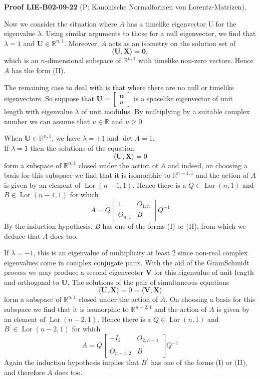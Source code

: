 \documentclass[10pt, letterpaper]{article}
\newcommand{\CustomHeading}[3]{%
  \par\medskip\noindent%
  \textbf{#1 #2} \textnormal{(#3)}.\enskip%
}
\newenvironment{PROOF}[2]{\begin{unitbox}\CustomHeading{Proof}{#1}{#2}}{\end{unitbox}}
\begin{document}
\begin{PROOF}{LIE-B02-09-22}{P: Kanonische Normalformen von Lorentz-Matrizen}
Now we consider the situation where $A$ has a timelike eigenvector U for the eigenvalue $\lambda$. Using similar arguments to those for a null eigenvector, we find that $\lambda=1$ and $\mathbf{U} \in \mathbb{R}^{n, 1}$. Moreover, $A$ acts as an isometry on the solution set of
$$
\langle\mathbf{U}, \mathbf{X}\rangle=\mathbf{0},
$$
which is an $n$-dimensional subspace of $\mathbb{R}^{n, 1}$ with timelike non-zero vectors. Hence $A$ has the form (II).

The remaining case to deal with is that where there are no null or timelike eigenvectors. So suppose that $\mathbf{U}=\left[\begin{array}{l}\mathbf{u} \\ u\end{array}\right]$ is a spacelike eigenvector of unit\\
length with eigenvalue $\lambda$ of unit modulus. By multiplying by a suitable complex number we can assume that $u \in \mathbb{R}$ and $u \geqslant 0$.


When $\mathbf{U} \in \mathbb{R}^{n, 1}$, we have $\lambda= \pm 1$ and $\operatorname{det} A=1$.\\
If $\lambda=1$ then the solutions of the equation
$$
\langle\mathbf{U}, \mathbf{X}\rangle=0
$$
form a subspace of $\mathbb{R}^{n, 1}$ closed under the action of $A$ and indeed, on choosing a basis for this subspace we find that it is isomorphic to $\mathbb{R}^{n-1,1}$ and the action of $A$ is given by an element of $\operatorname{Lor}(n-1,1)$. Hence there is a $Q \in \operatorname{Lor}(n, 1)$ and $B \in \operatorname{Lor}(n-1,1)$ for which
$$
A=Q\left[\begin{array}{cc}
1 & O_{1, n} \\
O_{n, 1} & B
\end{array}\right] Q^{-1}
$$
By the induction hypothesis, $B$ has one of the forms (I) or (II), from which we deduce that $A$ does too.

If $\lambda=-1$, this is an eigenvalue of multiplicity at least 2 since non-real complex eigenvalues come in complex conjugate pairs. With the aid of the GramSchmidt process we may produce a second eigenvector $\mathbf{V}$ for this eigenvalue of unit length and orthogonal to $\mathbf{U}$. The solutions of the pair of simultaneous equations
$$
\langle\mathbf{U}, \mathbf{X}\rangle=0=\langle\mathbf{V}, \mathbf{X}\rangle
$$
form a subspace of $\mathbb{R}^{n, 1}$ closed under the action of $A$. On choosing a basis for this subspace we find that it is isomorphic to $\mathbb{R}^{n-2,1}$ and the action of $A$ is given by an element of $\operatorname{Lor}(n-2,1)$. Hence there is a $Q \in \operatorname{Lor}(n, 1)$ and $B^{\prime} \in \operatorname{Lor}(n-2,1)$ for which
$$
A=Q\left[\begin{array}{cc}
-I_{2} & O_{2, n-1} \\
O_{n-1,2} & B^{\prime}
\end{array}\right] Q^{-1}
$$
Again the induction hypothesis implies that $B^{\prime}$ has one of the forms (I) or (II), and therefore $A$ does too.


\end{PROOF}
\end{document}
